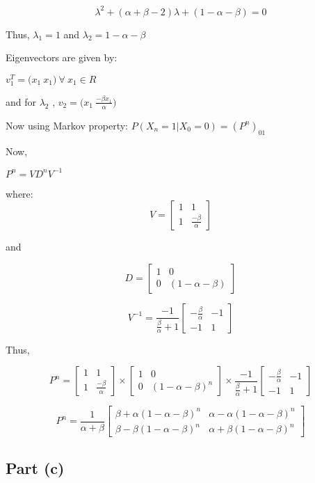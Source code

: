 \documentclass{article}
\begin{document}
\[
\lambda^2 +(\alpha + \beta-2) \lambda + (1-\alpha -\beta) = 0
\]

Thus, $\lambda_1 = 1$ and $\lambda_2 = 1-\alpha-\beta$

Eigenvectors are given by:

$v_1^T = \big( x_1\ x_1 \big)\ \forall\ x_1 \in R$

and for $\lambda_2$ , $v_2 = \big( x_1\ \frac{-\beta x_1}{\alpha} \big)$

Now using Markov property: $P(X_n=1|X_0=0) = (P^n)_{01}$

Now,

$P^n = VD^nV^{-1}$

where: \[
V = \begin{bmatrix}
1 & 1\\
1 & \frac{-\beta}{\alpha}
\end{bmatrix}
\]

and

\[
D = \begin{bmatrix}
1 & 0 \\
0 & (1-\alpha-\beta)
\end{bmatrix}
\]

\[
V^{-1} = \frac{-1}{\frac{\beta}{\alpha}+1}\begin{bmatrix}
-\frac{\beta}{\alpha} & -1 \\
-1 & 1
\end{bmatrix}
\]

Thus,

\[
P^n = \begin{bmatrix}
1 & 1\\
1 & \frac{-\beta}{\alpha}
\end{bmatrix} \times \begin{bmatrix}
1 & 0 \\
0 & (1-\alpha-\beta)^n
\end{bmatrix} \times \frac{-1}{\frac{\beta}{\alpha}+1}\begin{bmatrix}
-\frac{\beta}{\alpha} & -1 \\
-1 & 1
\end{bmatrix}
\]

\[
P^n = \frac{1}{\alpha+\beta} \begin{bmatrix}
\beta + \alpha(1-\alpha-\beta)^n & \alpha-\alpha(1-\alpha-\beta)^n\\
\beta - \beta(1-\alpha-\beta)^n & \alpha + \beta(1-\alpha-\beta)^n
\end{bmatrix}
\]

\subsection{Part (c)}\label{part-c}
\end{document}

